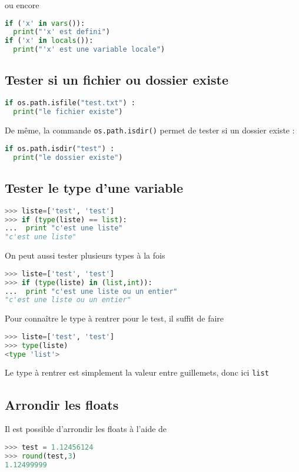 \documentclass[a4paper,twoside]{article}
\begin{document}
ou encore
\begin{lstlisting}[language=python]
if ('x' in vars()):
  print("'x' est defini")
if ('x' in locals()):
  print("'x' est une variable locale")
\end{lstlisting}

\subsection{Tester si un fichier ou dossier existe}
\begin{lstlisting}[language=python]
if os.path.isfile("test.txt") :
  print("le fichier existe")
\end{lstlisting}

De même, la commande \verb|os.path.isdir()| permet de tester si un dossier existe :
\begin{lstlisting}[language=python]
if os.path.isdir("test") :
  print("le dossier existe")
\end{lstlisting}

\subsection{Tester le type d'une variable}\label{sec:test-type-variable}
\begin{lstlisting}[language=python]
>>> liste=['test', 'test']
>>> if (type(liste) == list):
...  print "c'est une liste"
"c'est une liste"
\end{lstlisting}

On peut aussi tester plusieurs types à la fois
\begin{lstlisting}[language=python]
>>> liste=['test', 'test']
>>> if (type(liste) in (list,int)):
...  print "c'est une liste ou un entier"
"c'est une liste ou un entier"
\end{lstlisting}

Pour connaître le type à rentrer pour le test, il suffit de faire
\begin{lstlisting}[language=python]
>>> liste=['test', 'test']
>>> type(liste)
<type 'list'>
\end{lstlisting}
Le type à rentrer est simplement la valeur entre guillemets, donc ici \texttt{list}

\subsection{Arrondir les floats}
Il est possible d'arrondir les floats à l'aide de
\begin{lstlisting}[language=python]
>>> test = 1.12456124
>>> round(test,3)
1.12499999
\end{lstlisting}
\end{document}
